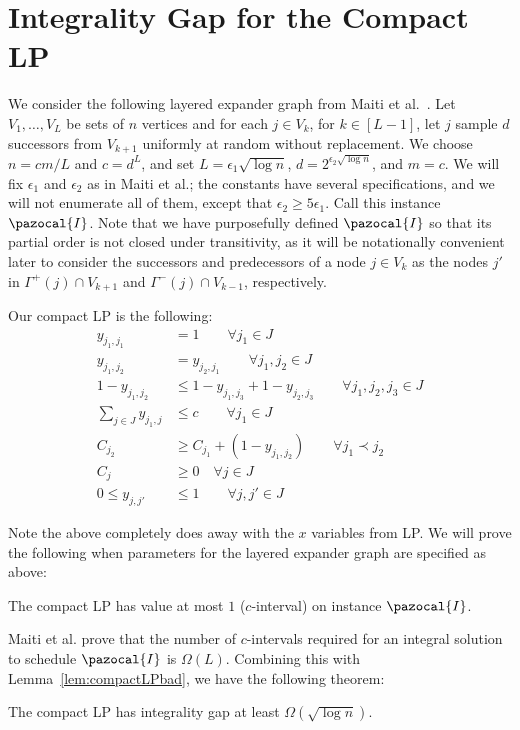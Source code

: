 \section{Integrality Gap for the Compact LP}\label{sec:IntegralityGap}

We consider the following layered expander graph from Maiti {et al.}~\cite{MRSSV}. Let $V_1,\ldots,V_L$ be sets of $n$ vertices and for each $j \in V_k$, for $k \in [L-1]$, let $j$ sample $d$ successors from $V_{k+1}$ uniformly at random without replacement. We choose $n = cm/L$ and $c = d^L$, and set $L = \epsilon_1 \sqrt{\log n}$, $d = 2^{\epsilon_2 \sqrt{\log n}}$, and $m=c$. We will fix  $\epsilon_1$ and $\epsilon_2$ as in Maiti et al.; the constants have several specifications, and we will not enumerate all of them, except that $\epsilon_2 \geq 5 \epsilon_1$.
 Call this instance $\pazocal{I}$. Note that we have purposefully defined $\pazocal{I}$ so that its partial order is not closed under transitivity, as it will be notationally convenient later to consider the successors and predecessors of a node $j \in V_k$ as the nodes $j'$ in $\Gamma^+(j) \cap V_{k+1}$ and $\Gamma^-(j) \cap V_{k-1}$, respectively.

Our compact LP is the following: 
\begin{align*}
y_{j_1,j_1}&=1 \qquad \forall j_1 \in J\\
y_{j_1,j_2} &= y_{j_2,j_1} \qquad \forall j_1,j_2 \in J\\
1-y_{j_1,j_2} &\leq 1-y_{j_1,j_3} + 1-y_{j_2,j_3} \qquad \forall j_1,j_2,j_3 \in J\\
\sum_{j \in J} y_{j_1,j} &\leq c \qquad \forall j_1 \in J\\
 C_{j_2} &\geq C_{j_1} + (1-y_{j_1,j_2}) \qquad \forall j_1 \prec j_2 \\
  C_j &\geq 0 \quad \forall j \in J \\
  0 \leq y_{j,j'} &\leq 1 \qquad \forall j,j' \in J
\end{align*}


Note the above completely does away with the $x$ variables from LP. 
We will prove the following when parameters for the layered expander graph are specified as above:




\begin{lemma}\label{lem:compactLPbad}
The compact LP has value at most $1$ ($c$-interval) on instance $\pazocal{I}$.
\end{lemma}
Maiti et al. prove that the number of $c$-intervals required for an integral solution to schedule $\pazocal{I}$ is $\Omega(L)$. Combining this with Lemma~\ref{lem:compactLPbad}, we have the following theorem:
\begin{theorem}\label{thm:compactLPintgap}
The compact LP has integrality gap at least $\Omega(\sqrt{\log n})$.
\end{theorem}

